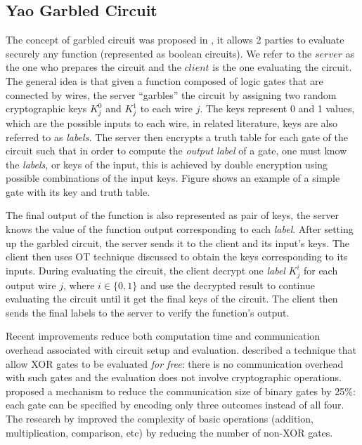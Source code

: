 \subsection{Yao Garbled Circuit}
\label{sec:yao-garbled-circuit}

% 

The concept of garbled circuit was proposed in , it allows 2 parties to evaluate securely any function (represented
as boolean circuits). We refer to the \(server\) as the one who prepares the
circuit and the \(client\) is the one evaluating the circuit. The general idea
is that given a function composed of logic gates that are connected by wires,
the server ``garbles'' the circuit by assigning two random cryptographic keys
\(K_{j}^{0}\) and \(K_{j}^{1}\) to each wire \(j\). The keys represent 0 and 1
values, which are the possible inputs to each wire, in related literature, keys
are also referred to as \textit{labels.}  The server then encrypts a truth table
for each gate of the circuit such that in order to compute the \textit{output
  label } of a gate, one must know the \textit{labels}, or keys of the input,
this is achieved by double encryption using possible combinations of the input
keys. Figure \missref{} shows an example of a simple gate with its key and truth
table.

The final output of the function is also represented as pair of keys, the server
knows the value of the function output corresponding to each
\textit{label}. After setting up the garbled circuit, the server sends it to the
client and its input's keys. The client then uses OT technique discussed to
obtain the keys corresponding to its inputs. During evaluating the circuit, the
client decrypt one \textit{label} \(K_{j}^{i}\) for each output wire \(j\),
where \(i \in \{0,1\}\) and use the decrypted result to continue evaluating the
circuit until it get the final keys of the circuit. The client then sends the
final labels to the server to verify the function's output.

Recent improvements reduce both computation time and communication overhead
associated with circuit setup and evaluation. 
described a technique that allow XOR gates to be evaluated \textit{for free}:
there is no communication overhead with such gates and the evaluation does not
involve cryptographic operations.  proposed a
mechanism to reduce the communication size of binary gates by 25\%: each gate
can be specified by encoding only three outcomes instead of all four. The
research by  improved the complexity of basic
operations (addition, multiplication, comparison, etc) by reducing the number of
non-XOR gates.



